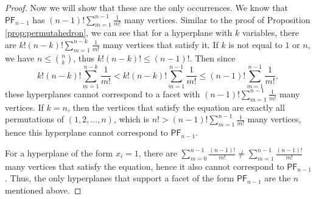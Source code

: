 \documentclass[10pt,a4paper]{amsart}
\newcommand{\PF}{\mathsf{PF}}
\begin{document}
\begin{proof}
Now we will show that these are the only occurrences. 
We know that $\PF_{n-1}$ has $(n-1)!\sum\limits_{m=1}^{n-1} \frac{1}{m!}$ many  vertices.
Similar to the proof of Proposition \ref{prop:permutahedron}, we can see that for a hyperplane with $k$ variables, there are $k!(n-k)!\sum\limits_{m=1}^{n-k} \frac{1}{m!}$ many vertices that satisfy it. 
If $k$ is not equal to $1$ or $n$, we have $n\leq \binom{n}{k}$, thus $k!(n-k)!\leq (n-1)!$.
Then since $$k!(n-k)!\sum\limits_{m=1}^{n-k} \frac{1}{m!} < k!(n-k)!\sum\limits_{m=1}^{n-1} \frac{1}{m!} \leq (n-1)! \sum\limits_{m=1}^{n-1} \frac{1}{m!},$$  these hyperplanes cannot correspond to a facet with $(n-1)!\sum\limits_{m=1}^{n-1} \frac{1}{m!}$ many vertices.
If $k =n$, then the vertices that satisfy the equation are exactly all permutations of $(1,2,\dots, n)$, which is $n! > (n-1)! \sum\limits_{m=1}^{n-1} \frac{1}{m!}$ many vertices, hence this hyperplane cannot correspond to $\PF_{n-1}$. 

For a hyperplane of the form $x_i = 1$, there are $\sum_{m=0}^{n-1}\frac{(n-1)!}{m!} \neq \sum_{m=1}^{n-1} \frac{(n-1)!}{m!}$ many vertices that satisfy the equation, hence it also cannot correspond to $\PF_{n-1}$. 
Thus, the only hyperplanes that support a facet of the form $\PF_{n-1}$ are the $n$ mentioned above.
\end{proof}
\end{document}
